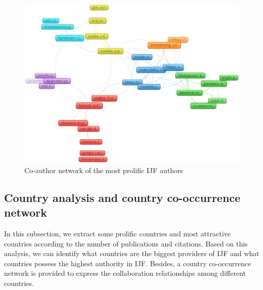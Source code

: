 \documentclass[11pt,a4paper]{elsarticle} %
\begin{document}
\begin{figure}[htbp]
\centering
\includegraphics[scale=0.4]{fig.5.eps}
\caption{Co-author network of the most prolific IJF authors}
\end{figure}

\subsection{Country analysis and country co-occurrence
network}\label{country-analysis-and-country-co-occurrence-network}

In this subsection, we extract some prolific countries and most
attractive countries according to the number of publications and
citations. Based on this analysis, we can identify what countries are
the biggest providers of IJF and what countries possess the highest
authority in IJF. Besides, a country co-occurrence network is provided
to express the collaboration relationships among different countries.
\end{document}
